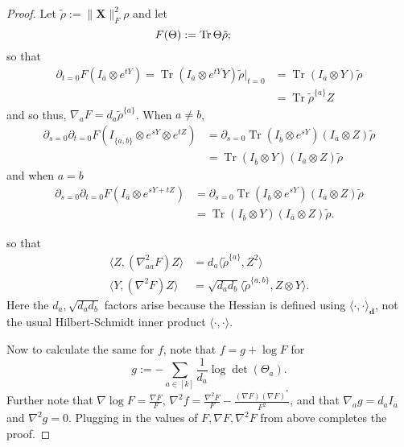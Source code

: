 \documentclass{article}
\renewcommand{\vec}{\bm}
\newcommand\tr{\operatorname{Tr}}
\begin{document}
\begin{proof}
Let $\tilde{\rho}:= \|\vec X\|_F^2\rho$ and let
\[ F(\Theta) := \tr  \Theta \tilde{\rho}; \hspace{10mm} \]
so that
\begin{align*} \partial_{t=0} F(I_{\overline{a}} \otimes e^{tY}) = \tr  (I_{\overline{a}} \otimes e^{tY}  Y)\tilde{\rho}  |_{t=0} &= \tr  (I_{\overline{a}} \otimes Y) \tilde{\rho} \\
&=\tr \tilde{\rho}^{\{a\}}  Z
 \end{align*}
 and so thus, $\nabla_a F = d_a \tilde{\rho}^{\{a\}}$.
When $a\neq b$,
\begin{align*}\partial_{s=0} \partial_{t=0} F(I_{\overline{\{a,b\}}} \otimes e^{sY} \otimes e^{tZ}) &=  \partial_{s=0} \tr  (I_{\overline{b}} \otimes e^{sY}) (I_{\overline{a}} \otimes Z) \tilde{\rho} \\
&= \tr (I_{\overline{b}} \otimes Y) (I_{\overline{a}} \otimes Z) \tilde{\rho}
\end{align*}
and when $a = b$
\begin{align*}\partial_{s=0} \partial_{t=0} F(I_{\overline{a}} \otimes e^{sY+ tZ}) &=  \partial_{s=0} \tr  (I_{\overline{b}} \otimes e^{sY}) (I_{\overline{a}} \otimes Z) \tilde{\rho} \\
&= \tr (I_{\overline{b}} \otimes Y) (I_{\overline{a}} \otimes Z) \tilde{\rho}.
\end{align*}

so that
\begin{align*} \langle Z, (\nabla^{2}_{aa} F) Z \rangle &= d_a \langle  \tilde{\rho}^{\{a\}}, Z^{2}\rangle   \\
 \langle Y, (\nabla^{2} F) Z \rangle &= \sqrt{d_a d_b}\langle \tilde{\rho}^{\{a,b\}} , Z \otimes Y \rangle . \end{align*}
Here the $d_a, \sqrt{d_a d_b}$ factors arise because the Hessian is defined using $\langle \cdot, \cdot \rangle_{\vec d}$, not the usual Hilbert-Schmidt inner product $\langle \cdot, \cdot \rangle$.

Now to calculate the same for $f$, note that $f = g + \log F $ for
$$g:= - \sum_{a \in [k]} \frac1{d_a} \log\det(\Theta_a).$$ Further note that $\nabla \log F = \frac{\nabla F}{F}$, $\nabla^{2} f = \frac{\nabla^{2} F}{F} - \frac{(\nabla F)(\nabla F)^{*}}{F^{2}}$, and that $\nabla_a g = d_a I_{a}$ and $\nabla^2 g = 0$. Plugging in the values of $F, \nabla F, \nabla^2 F$ from above completes the proof. \end{proof}
\end{document}

